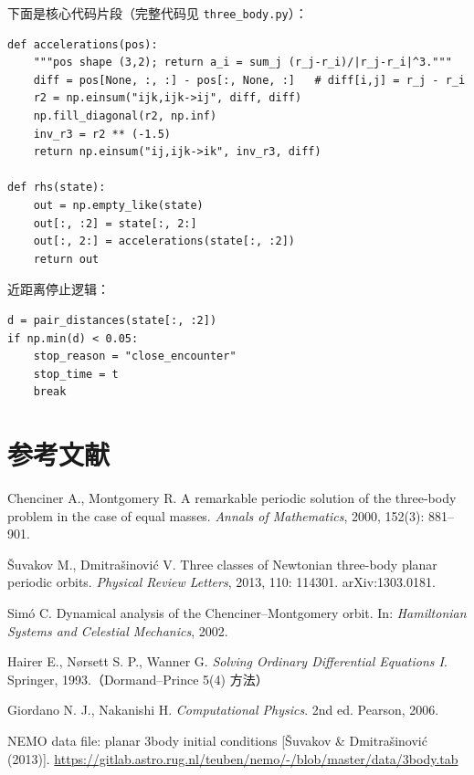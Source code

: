 \documentclass[UTF8,fontset=windows,11pt,a4paper]{ctexart}
\begin{document}
下面是核心代码片段（完整代码见 \texttt{three\_body.py}）：
\begin{lstlisting}
def accelerations(pos):
    """pos shape (3,2); return a_i = sum_j (r_j-r_i)/|r_j-r_i|^3."""
    diff = pos[None, :, :] - pos[:, None, :]   # diff[i,j] = r_j - r_i
    r2 = np.einsum("ijk,ijk->ij", diff, diff)
    np.fill_diagonal(r2, np.inf)
    inv_r3 = r2 ** (-1.5)
    return np.einsum("ij,ijk->ik", inv_r3, diff)

def rhs(state):
    out = np.empty_like(state)
    out[:, :2] = state[:, 2:]
    out[:, 2:] = accelerations(state[:, :2])
    return out
\end{lstlisting}

近距离停止逻辑：
\begin{lstlisting}
d = pair_distances(state[:, :2])
if np.min(d) < 0.05:
    stop_reason = "close_encounter"
    stop_time = t
    break
\end{lstlisting}

\section*{参考文献}
\begin{enumerate}[label={[\arabic*]},leftmargin=2.2em,itemsep=1pt]
\item Chenciner A., Montgomery R. A remarkable periodic solution of the three-body problem in
the case of equal masses. \emph{Annals of Mathematics}, 2000, 152(3): 881--901.
\item Šuvakov M., Dmitrašinović V. Three classes of Newtonian three-body planar periodic orbits.
\emph{Physical Review Letters}, 2013, 110: 114301. arXiv:1303.0181.
\item Sim\'o C. Dynamical analysis of the Chenciner--Montgomery orbit. In:
\emph{Hamiltonian Systems and Celestial Mechanics}, 2002.
\item Hairer E., Nørsett S. P., Wanner G. \emph{Solving Ordinary Differential Equations I}.
Springer, 1993.（Dormand--Prince 5(4) 方法）
\item Giordano N. J., Nakanishi H. \emph{Computational Physics}. 2nd ed. Pearson, 2006.
\item NEMO data file: planar 3body initial conditions [Šuvakov \& Dmitrašinović (2013)].
\url{https://gitlab.astro.rug.nl/teuben/nemo/-/blob/master/data/3body.tab}
\end{enumerate}
\end{document}
